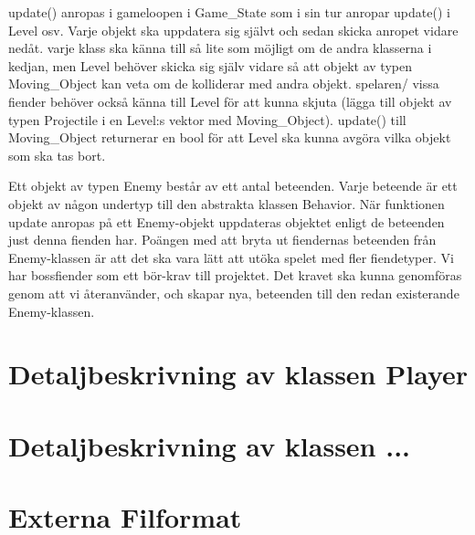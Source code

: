 \documentclass{TDP005mall}
\begin{document}
update() anropas i gameloopen i Game\_State som i sin tur anropar update() i Level osv. Varje objekt ska uppdatera sig självt och sedan skicka anropet vidare nedåt. varje klass ska känna till så lite som möjligt om de andra klasserna i kedjan, men Level behöver skicka sig själv vidare så att objekt av typen Moving\_Object kan veta om de kolliderar med andra objekt. spelaren/ vissa fiender behöver också känna till Level för att kunna skjuta (lägga till objekt av typen Projectile i en Level:s vektor med Moving\_Object). update() till Moving\_Object returnerar en bool för att Level ska kunna avgöra vilka objekt som ska tas bort.

Ett objekt av typen Enemy består av ett antal beteenden. Varje beteende är ett objekt av någon undertyp till den abstrakta klassen Behavior. När funktionen update anropas på ett Enemy-objekt uppdateras objektet enligt de beteenden just denna fienden har. Poängen med att bryta ut fiendernas beteenden från Enemy-klassen är att det ska vara lätt att utöka spelet med fler fiendetyper. Vi har bossfiender som ett bör-krav till projektet. Det kravet ska kunna genomföras genom att vi återanvänder, och skapar nya, beteenden till den redan existerande Enemy-klassen.  

\section{Detaljbeskrivning av klassen Player}

\section{Detaljbeskrivning av klassen ...}



\section{Externa Filformat}

\newpage
\printbibliography
\end{document}
